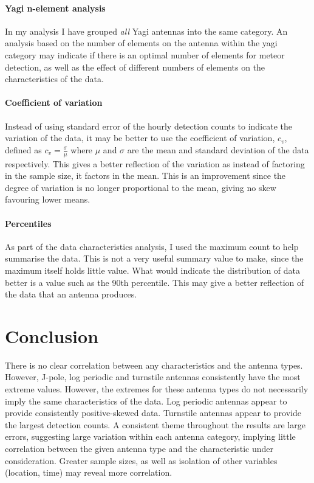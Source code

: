 \paragraph{Yagi n-element analysis\\}
In my analysis I have grouped {\it all} Yagi antennas into the same category. An analysis based on the number of elements on the antenna within the yagi category may indicate if there is an optimal number of elements for meteor detection, as well as the effect of different numbers of elements on the characteristics of the data.
\paragraph{Coefficient of variation\\} 
Instead of using standard error of the hourly detection counts to indicate the variation of the data, it may be better to use the coefficient of variation, $c_v$, defined as $c_v = \frac{\sigma}{\mu}$ where $\mu$ and $\sigma$ are the mean and standard deviation of the data respectively. This gives a better reflection of the variation as instead of factoring in the sample size, it factors in the mean. This is an improvement since the degree of variation is no longer proportional to the mean, giving no skew favouring lower means.
\paragraph{Percentiles\\}
As part of the data characteristics analysis, I used the maximum count to help summarise the data. This is not a very useful summary value to make, since the maximum itself holds little value. What would indicate the distribution of data better is a value such as the 90th percentile. This may give a better reflection of the data that an antenna produces.
\section{Conclusion}
There is no clear correlation between any characteristics and the antenna types. However, J-pole, log periodic and turnstile antennas consistently have the most extreme values. However, the extremes for these antenna types do not necessarily imply the same characteristics of the data. Log periodic antennas appear to provide consistently positive-skewed data. Turnstile antennas appear to provide the largest detection counts. A consistent theme throughout the results are large errors, suggesting large variation within each antenna category, implying little correlation between the given antenna type and the characteristic under consideration. Greater sample sizes, as well as isolation of other variables (location, time) may reveal more correlation.